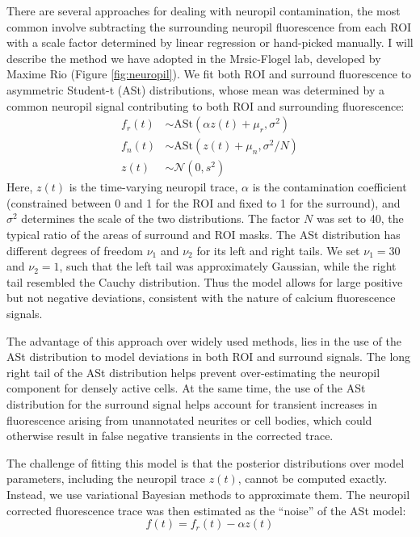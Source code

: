 \documentclass[a4paper]{report}
\begin{document}
There are several approaches for dealing with neuropil contamination, the most common involve subtracting the surrounding neuropil fluorescence from each ROI with a scale factor determined by linear regression or hand-picked manually. I will describe the method we have adopted in the Mrsic-Flogel lab, developed by Maxime Rio (Figure \ref{fig:neuropil}). 
We fit both ROI and surround fluorescence to asymmetric Student-t (ASt) distributions, whose mean was determined by a common neuropil signal contributing to both ROI and surrounding fluorescence:
\begin{align}
	f_r(t) &\sim \mathrm{ASt}(\alpha z(t) + \mu_r, \sigma^2) \\
	f_n(t) &\sim \mathrm{ASt}(z(t) + \mu_n, \sigma^2 / N) \label{eq:ast_n}\\
	z(t) &\sim \mathcal{N}(0, s^2)
\end{align}
Here, $z(t)$ is the time-varying neuropil trace, $\alpha$ is the contamination coefficient (constrained between 0 and 1 for the ROI and fixed to 1 for the surround), and $\sigma^2$ determines the scale of the two distributions. 
The factor $N$ was set to 40, the typical ratio of the areas of surround and ROI masks. 
The ASt distribution has different degrees of freedom $\nu_1$ and $\nu_2$ for its left and right tails. 
We set $\nu_1=30$ and $\nu_2=1$, such that the left tail was approximately Gaussian, while the right tail resembled the Cauchy distribution. 
Thus the model allows for large positive but not negative deviations, consistent with the nature of calcium fluorescence signals.

The advantage of this approach over widely used methods, lies in the use of the ASt distribution to model deviations in both ROI and surround signals. 
The long right tail of the ASt distribution helps prevent over-estimating the neuropil component for densely active cells. 
At the same time, the use of the ASt distribution for the surround signal helps account for transient increases in fluorescence arising from unannotated neurites or cell bodies, which could otherwise result in false negative transients in the corrected trace.

The challenge of fitting this model is that the posterior distributions over model parameters, including the neuropil trace $z(t)$, cannot be computed exactly. 
Instead, we use variational Bayesian methods to approximate them. The neuropil corrected fluorescence trace was then estimated as the ``noise'' of the ASt model:
\begin{equation}
	f(t) = f_r(t)- \alpha z(t)
\end{equation}
\end{document}
